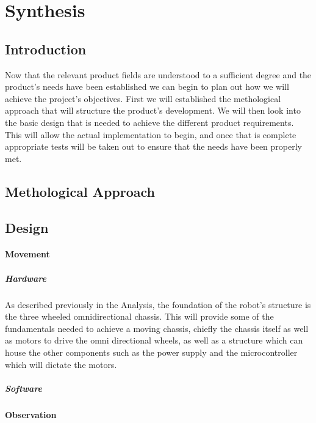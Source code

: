 \part{Synthesis}
	\chapter{Introduction}
	Now that the relevant product fields are understood to a sufficient degree and the product's needs have been established we can begin to plan out how we will achieve the project's objectives. First we will established the methological approach that will structure the product's development. We will then look into the basic design that is needed to achieve the different product requirements. This will allow the actual implementation to begin, and once that is complete appropriate tests will be taken out to ensure that the needs have been properly met.
	
	\chapter{Methological Approach}
	
	\chapter{Design}
		\subsection{Movement}
			\subsubsection{Hardware}
			As described previously in the Analysis, the foundation of the robot's structure is the three wheeled omnidirectional chassis. This will provide some of the fundamentals needed to achieve a moving chassis, chiefly the chassis itself as well as motors to drive the omni directional wheels, as well as a structure which can house the other components such as the power supply and the microcontroller which will dictate the motors.
			
			\subsubsection{Software}
		
		
		\subsection{Observation}
